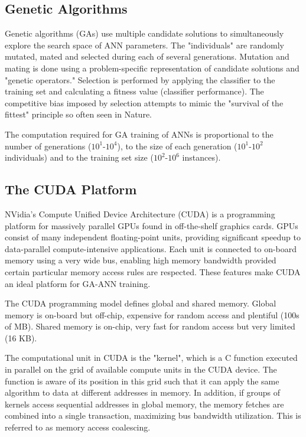 \documentclass[11pt]{article}       %
\begin{document}
\subsection{Genetic Algorithms} \label{ga}
Genetic algorithms (GAs) use multiple candidate solutions to simultaneously explore the search space of ANN parameters. The "individuals" are randomly mutated, mated and selected during each of several generations. Mutation and mating is done using a problem-specific representation of candidate solutions and "genetic operators." Selection is performed by applying the classifier to the training set and calculating a fitness value (classifier performance). The competitive bias imposed by selection attempts to mimic the "survival of the fittest" principle so often seen in Nature.

The computation required for GA training of ANNs is proportional to the number of generations ($10^1$-$10^4$), to the size of each generation ($10^1$-$10^2$ individuals) and to the training set size ($10^2$-$10^6$ instances).

\subsection{The CUDA Platform} \label{cuda}
NVidia's Compute Unified Device Architecture (CUDA) is a programming platform for massively parallel GPUs found in off-the-shelf graphics cards. GPUs consist of many independent floating-point units, providing significant speedup to data-parallel compute-intensive applications. Each unit is connected to on-board memory using a very wide bus, enabling high memory bandwidth provided certain particular memory access rules are respected. These features make CUDA an ideal platform for GA-ANN training.

The CUDA programming model defines global and shared memory. Global memory is on-board but off-chip, expensive for random access and plentiful (100s of MB). Shared memory is on-chip, very fast for random access but very limited (16 KB).

The computational unit in CUDA is the "kernel", which is a C function executed in parallel on the grid of available compute units in the CUDA device. The function is aware of its position in this grid such that it can apply the same algorithm to data at different addresses in memory. In addition, if groups of kernels access sequential addresses in global memory, the memory fetches are combined into a single transaction, maximizing bus bandwidth utilization. This is referred to as memory access coalescing.
\end{document}
